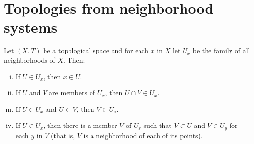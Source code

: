\section{Topologies from neighborhood systems}

\begin{problem}
  Let $(X,T)$ be a topological space and for each $x$ in $X$ let $U_{x}$ be the family of all neighborhoods of $X$. Then:
  \begin{enumerate}[(i)]
    \item
      If $U\in{U_{x}}$, then $x\in{U}$.
    \item
      If $U$ and $V$ are members of $U_{x}$, then $U\cap{V}\in{U_{x}}$.
    \item
      If $U\in{U_{x}}$ and $U\subset{V}$, then $V\in{U_{x}}$.
    \item
      If $U\in{U_{x}}$, then there is a member $V$ of $U_{x}$ such that $V\subset{U}$ and $V\in{U_{y}}$ for each $y$ in $V$ (that is, $V$ is a neighborhood of each of its points).
  \end{enumerate}
\end{problem}
